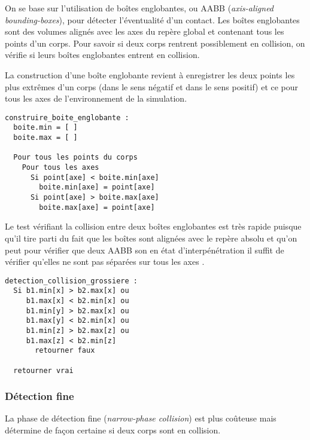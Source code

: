 On se base sur l'utilisation de boîtes englobantes, ou AABB
(\textit{axis-aligned bounding-boxes}), pour détecter l'éventualité
d'un contact. Les boîtes englobantes sont des volumes alignés avec les
axes du repère global et contenant tous les points d'un corps. Pour
savoir si deux corps rentrent possiblement en collision, on vérifie si
leurs boîtes englobantes entrent en collision.

La construction d'une boîte englobante revient à enregistrer les deux
points les plus extrêmes d'un corps (dans le sens négatif et dans le
sens positif) et ce pour tous les axes de l'environnement de la simulation.

\begin{verbatim}
construire_boite_englobante :
  boite.min = [ ]
  boite.max = [ ]

  Pour tous les points du corps
    Pour tous les axes
      Si point[axe] < boite.min[axe]
        boite.min[axe] = point[axe]
      Si point[axe] > boite.max[axe]
        boite.max[axe] = point[axe]
\end{verbatim}

Le test vérifiant la collision entre deux boîtes englobantes est très
rapide puisque qu'il tire parti du fait que les boîtes sont alignées
avec le repère absolu et qu'on peut pour vérifier que deux AABB son en
état d'interpénétration il suffit de vérifier qu'elles ne sont pas
séparées sur tous les axes \cite{ericson05}.

\begin{verbatim}
detection_collision_grossiere :
  Si b1.min[x] > b2.max[x] ou
     b1.max[x] < b2.min[x] ou
     b1.min[y] > b2.max[x] ou
     b1.max[y] < b2.min[x] ou
     b1.min[z] > b2.max[z] ou
     b1.max[z] < b2.min[z]
       retourner faux

  retourner vrai
\end{verbatim}

\begin{figure}
  \subfigure{  }
  \subfigure{  }
  \subfigure{  }
\end{figure}

\subsubsection{Détection fine}

La phase de détection fine (\textit{narrow-phase collision}) est plus
coûteuse mais détermine de façon certaine si deux corps sont en
collision.


